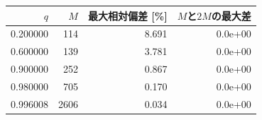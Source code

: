 \begin{tabular}{rrrr}\toprule
$q$ & $M$ & 最大相対偏差 [\%] & $M$と$2M$の最大差\\\midrule
0.200000 & 114 & 8.691 & 0.0e+00 \\
0.600000 & 139 & 3.781 & 0.0e+00 \\
0.900000 & 252 & 0.867 & 0.0e+00 \\
0.980000 & 705 & 0.170 & 0.0e+00 \\
0.996008 & 2606 & 0.034 & 0.0e+00 \\
\bottomrule\end{tabular}
